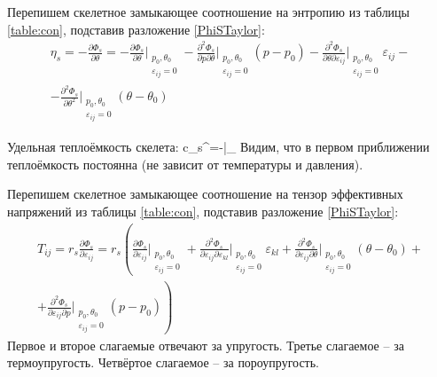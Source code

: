 \documentclass[main.tex]{subfiles}
\begin{document}
Перепишем скелетное замыкающее соотношение на энтропию из таблицы \ref{table:con}, подставив разложение \ref{PhiSTaylor}:
\begin{multline}
\eta_s=-\frac{\partial\Phi_s}{\partial\theta}=-\frac{\partial\Phi_s}{\partial\theta}\bigg|_{\substack{p_0,\theta_0\\\varepsilon_{ij}=0}}-\frac{\partial^2\Phi_s}{\partial p\partial\theta}\bigg|_{\substack{p_0,\theta_0\\\varepsilon_{ij}=0}}\left(p-p_0\right)-\frac{\partial^2\Phi_s}{\partial\theta\partial\varepsilon_{ij}}\bigg|_{\substack{p_0,\theta_0\\\varepsilon_{ij}=0}}\varepsilon_{ij}-\\-\frac{\partial^2\Phi_s}{\partial\theta^2}\bigg|_{\substack{p_0,\theta_0\\\varepsilon_{ij}=0}}\left(\theta-\theta_0\right)
\end{multline}

Удельная теплоёмкость скелета:
\beq
c_s^\theta=\theta{}\approx -\theta{}\bigg|_{}
\eeq
Видим, что в первом приближении теплоёмкость постоянна (не зависит от температуры и давления).

Перепишем скелетное замыкающее соотношение на тензор эффективных напряжений из таблицы \ref{table:con}, подставив разложение \ref{PhiSTaylor}:
\begin{multline}\label{TIJ}
T_{ij}=r_s\frac{\partial\Phi_s}{\partial\varepsilon_{ij}}=r_s\left(\frac{\partial\Phi_s}{\partial\varepsilon_{ij}}\bigg|_{\substack{p_0,\theta_0\\\varepsilon_{ij}=0}}+\frac{\partial^2\Phi_s}{\partial\varepsilon_{ij}\partial\varepsilon_{kl}}\bigg|_{\substack{p_0,\theta_0\\\varepsilon_{ij}=0}}\varepsilon_{kl}+\frac{\partial^2\Phi_s}{\partial\varepsilon_{ij}\partial\theta}\bigg|_{\substack{p_0,\theta_0\\\varepsilon_{ij}=0}}\left(\theta-\theta_0\right)+\right. \\ \left.+\frac{\partial^2\Phi_s}{\partial\varepsilon_{ij}\partial p}\bigg|_{\substack{p_0,\theta_0\\\varepsilon_{ij}=0}}\left(p-p_0\right)\right)
\end{multline}
Первое и второе слагаемые отвечают за упругость. Третье слагаемое -- за термоупругость. Четвёртое слагаемое -- за пороупругость.
\end{document}
